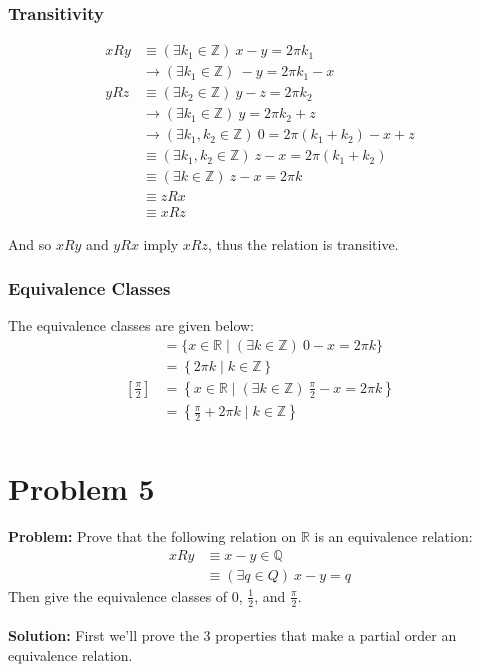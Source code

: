 \documentclass{article}
\begin{document}
\subsubsection*{Transitivity}
\begin{align*}
xRy&\equiv (\exists k_1\in\mathbb Z)\ x-y=2\pi k_1\tag{definition}\\
&\rightarrow (\exists k_1\in\mathbb Z)\ -y=2\pi k_1-x\tag{arithmetic}\\
yRz&\equiv (\exists k_2\in\mathbb Z)\ y-z=2\pi k_2\tag{definition}\\
&\rightarrow (\exists k_1\in\mathbb Z)\ y=2\pi k_2+z\tag{arithmetic}\\
&\rightarrow(\exists k_1,k_2\in\mathbb Z)\ 0=2\pi(k_1+k_2)-x+z\tag{sum of lines 2 \& 4}\\
&\equiv(\exists k_1,k_2\in\mathbb Z)\ z-x=2\pi(k_1+k_2)\tag{arithmetic}\\
&\equiv(\exists k\in\mathbb Z)\ z-x=2\pi k\tag{closure of $\mathbb Z$ under addition}\\
&\equiv zRx \tag{definition}\\
&\equiv xRz \tag{symmetry of $R$}
\end{align*}

And so $xRy$ and $yRx$ imply $xRz$, thus the relation is transitive.

\subsubsection*{Equivalence Classes}
The equivalence classes are given below:
\begin{align*}
  [0]&=\{x\in\mathbb R\mid (\exists k\in\mathbb Z)\ 0-x=2\pi k\}\\
  &=\left\{2\pi k\mid k\in\mathbb Z\right\}\\
  \left[\frac{\pi}{2}\right]&=\left\{x\in\mathbb R\mid (\exists k\in\mathbb Z)\ \frac{\pi}{2}-x=2\pi k\right\}\\
  &=\left\{\frac{\pi}{2}+2\pi k\mid k\in\mathbb Z\right\}\\
\end{align*}

\section*{Problem 5}
\textbf{Problem:} Prove that the following relation on $\mathbb R$ is an equivalence relation:
\begin{align*}
xRy&\equiv x-y\in\mathbb Q\\
&\equiv (\exists q\in Q)\ x-y=q
\end{align*}
Then give the equivalence classes of 0, $\frac{1}{2}$, and $\frac{\pi}{2}$.
\\\\
\textbf{Solution:} First we'll prove the 3 properties that make a partial order an equivalence relation.
\end{document}
